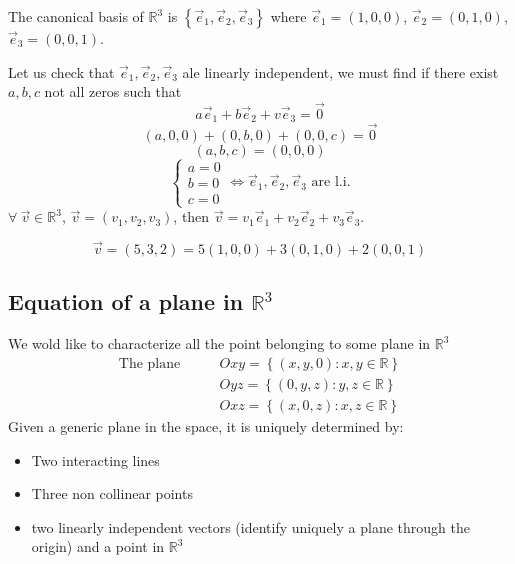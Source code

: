 The canonical basis of $\mathbb{R}^3$ is $\left\{ \vec e_1, \vec e_2, \vec e_3 \right\}$ where $\vec e_1 = (1,0,0)$, $\vec e_2 = (0,1,0)$, $\vec e_3 = (0,0,1)$.

Let us check that $\vec e_1, \vec e_2, \vec e_3$ ale linearly independent, we must find if there exist $a,b,c$ not all zeros such that 
$$a   \vec e_1 + b \vec e_2 + v \vec e_3 = \vec 0$$
$$(a,0,0) + (0,b,0) + (0,0,c) = \vec 0$$
$$(a,b,c) = (0,0,0)$$
$$\begin{cases}
    a=0\\
    b = 0\\
    c=0
\end{cases} \iff \vec e_1, \vec e_2, \vec e_3 \text{ are l.i.}$$
$\forall \ \vec v\in \mathbb{R}^3$, $\vec v = (v_1, v_2, v_3)$, then $\vec v = v_1 \vec e_1 + v_2 \vec e_2 + v_3 \vec e_3$. 
\begin{example}
  $$\vec v = (5,3,2) = 5(1,0,0) + 3(0,1,0) + 2(0,0,1)$$
\end{example}
\subsection{Equation of a plane in $\mathbb{R}^3$}
We wold like to characterize all the point belonging to some plane in $\mathbb{R}^3$
\begin{align*}
    \text{The plane}\qquad &Oxy = \left\{ (x,y,0): x,y \in \mathbb{R} \right\} \\
    &Oyz = \left\{ (0,y,z): y,z \in \mathbb{R} \right\} \\
    &Oxz = \left\{ (x,0,z): x,z \in \mathbb{R} \right\} 
\end{align*}
Given a generic plane in the space, it is uniquely determined by: 
\begin{itemize}
    \item Two interacting lines
    \item Three non collinear points 
    \item two linearly independent vectors (identify uniquely a plane through the origin) and a point in $\mathbb{R}^3$
\end{itemize}

